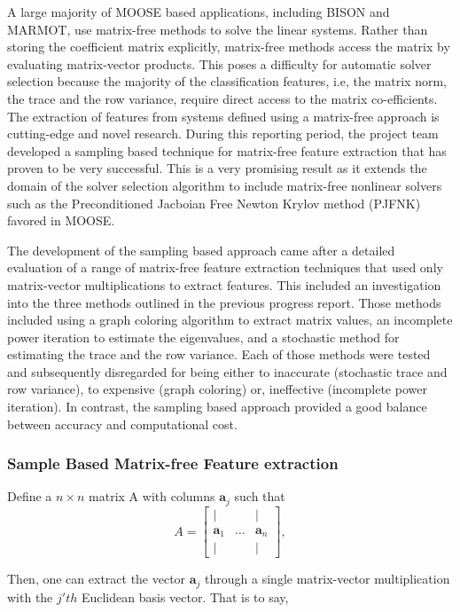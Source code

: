 A large majority of MOOSE based applications, including BISON and MARMOT, use matrix-free methods to solve
the linear systems. Rather than storing the coefficient matrix explicitly, matrix-free methods access the matrix by evaluating matrix-vector products. This poses a difficulty for automatic solver selection because the majority of the classification features, i.e, the matrix norm, the trace and the row variance, require direct access to the matrix co-efficients.  The extraction of features from systems defined using a matrix-free approach is cutting-edge and novel research. During this reporting period, the project team developed a sampling based technique for matrix-free feature extraction that has proven to be very successful. This is a very promising result as it extends the domain of the solver selection algorithm to include matrix-free nonlinear solvers such as the Preconditioned Jacboian Free Newton Krylov method (PJFNK) favored in MOOSE. 

The development of the sampling based approach came after a detailed evaluation of a range of matrix-free feature extraction techniques that used only matrix-vector multiplications to extract features. This included an investigation into the three methods outlined in the previous progress report. Those methods included using a graph coloring algorithm to extract matrix values, an incomplete power iteration to estimate the eigenvalues, and a stochastic method for estimating the trace and the row variance. Each of those methods were tested and subsequently disregarded for being either to inaccurate (stochastic trace and row variance), to expensive (graph coloring) or, ineffective (incomplete power iteration). In contrast, the sampling based approach provided a good balance between accuracy and computational cost. 

\subsubsection{Sample Based Matrix-free Feature extraction}

Define a $n\times n$ matrix A with columns $\mathbf{a}_j$ such that  
\[ A = 
\begin{bmatrix}
    \vert & & \vert \\
    \mathbf{a}_1   & \dots &\mathbf{a}_n   \\
    \vert & & \vert
\end{bmatrix},
\]   

Then, one can extract the vector $\mathbf{a}_j$ through a single matrix-vector multiplication with the $j'th$ Euclidean basis vector. That is to say, 


